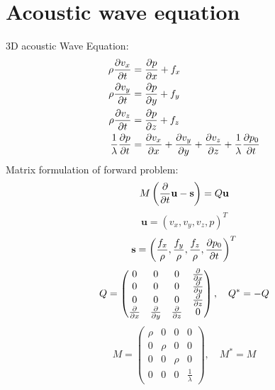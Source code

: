 \documentclass[pdftex,a4paper,parskip,listof=totoc,bibliography=totoc,onehalfspacing,12pt]{scrreprt}
\begin{document}
\section{Acoustic wave equation}
3D acoustic Wave Equation:
\begin{align}
\rho\pdv{v_x}{t}&=\pdv{p}{x} + f_x\\
\rho\pdv{v_y}{t}&=\pdv{p}{y} + f_y\\
\rho\pdv{v_z}{t}&=\pdv{p}{z} + f_z\\
\frac{1}{\lambda}\pdv{p}{t} &= \pdv{v_x}{x} +  \pdv{v_y}{y} + \pdv{v_z}{z} + \frac{1}{\lambda}\pdv{p_0}{t}
\end{align}
Matrix formulation of forward problem:
\begin{equation}
 M\left( \pdv{}{t}\mathbf{u}-\mathbf{s} \right) =Q\mathbf{u}
\end{equation}
\begin{equation}
\mathbf{u}=\left(v_x,v_y,v_z,p \right)^T
\end{equation}
\begin{equation}
\mathbf{s}=\left(\frac{f_x}{\rho},\frac{f_y}{\rho},\frac{f_z}{\rho},\pdv{p_0}{t}\right)^T
\end{equation}
\begin{equation}
Q=
 \begin{pmatrix}
   0         & 0         & 0         & \pdv{}{x}\\
   0         & 0         & 0         & \pdv{}{y}\\
   0         & 0         & 0         & \pdv{}{z}\\
   \pdv{}{x} & \pdv{}{y} & \pdv{}{z} & 0        
 \end{pmatrix}, \quad Q^{*} = -Q
\end{equation}
\begin{equation}
M=
 \begin{pmatrix}
   \rho       & 0         & 0         & 0                \\
   0          & \rho      & 0         & 0                \\
   0          & 0         & \rho      & 0                \\
   0          & 0         & 0         & \frac{1}{\lambda}
 \end{pmatrix}, \quad M^{*}=M
\end{equation}
\end{document}
